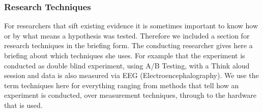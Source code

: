 \subsubsection{Research Techniques}

For researchers that sift existing evidence it is sometimes important to know how or by what means a hypothesis was tested. Therefore we included a section for research techniques in the briefing form. The conducting researcher gives here a briefing about which techniques she uses. For example that the experiment is conducted as double blind experiment, using A/B Testing, with a Think aloud session and data is also measured via EEG (Electroencephalography). We use the term techniques here for everything ranging from methods that tell how an experiment is conducted, over measurement techniques, through to the hardware that is used.
